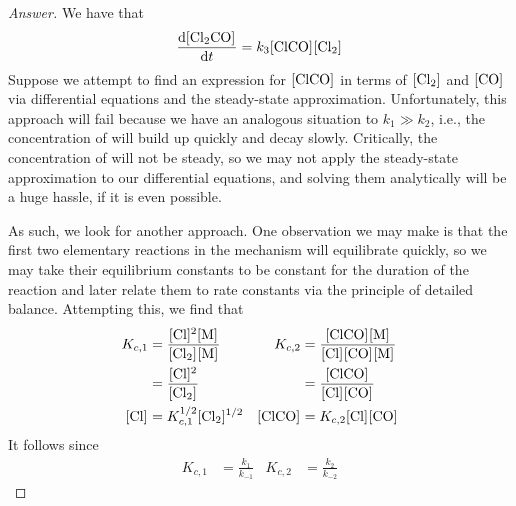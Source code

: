 \documentclass[../psets.tex]{subfiles}
\begin{document}
\begin{enumerate}[label={\textbf{29-\arabic*.}},leftmargin=3.5em]
\begin{proof}[Answer]


        We have that
        \begin{equation*}
            \dv{\cnc{Cl2CO}}{t} = k_3\cnc{ClCO}\cnc{Cl2}
        \end{equation*}
        Suppose we attempt to find an expression for $\cnc{ClCO}$ in terms of $\cnc{Cl2}$ and $\cnc{CO}$ via differential equations and the steady-state approximation. Unfortunately, this approach will fail because we have an analogous situation to $k_1\gg k_2$, i.e., the concentration of  will build up quickly and decay slowly. Critically, the concentration of  will not be steady, so we may not apply the steady-state approximation to our differential equations, and solving them analytically will be a huge hassle, if it is even possible.\par
        As such, we look for another approach. One observation we may make is that the first two elementary reactions in the mechanism will equilibrate quickly, so we may take their equilibrium constants to be constant for the duration of the reaction and later relate them to rate constants via the principle of detailed balance. Attempting this, we find that
        \begin{align*}
            K_{c,1} &= \frac{\cnc{Cl}^2\cnc{M}}{\cnc{Cl2}\cnc{M}}&
                K_{c,2} &= \frac{\cnc{ClCO}\cnc{M}}{\cnc{Cl}\cnc{CO}\cnc{M}}\\
            &= \frac{\cnc{Cl}^2}{\cnc{Cl2}}&
                &= \frac{\cnc{ClCO}}{\cnc{Cl}\cnc{CO}}\\
            \cnc{Cl} &= K_{c,1}^{1/2}\cnc{Cl2}^{1/2}&
                \cnc{ClCO} &= K_{c,2}\cnc{Cl}\cnc{CO}
        \end{align*}
        It follows since
        \begin{align*}
            K_{c,1} &= \frac{k_1}{k_{-1}}&
            K_{c,2} &= \frac{k_2}{k_{-2}}

\end{align*}
\end{proof}
\end{enumerate}
\end{document}
